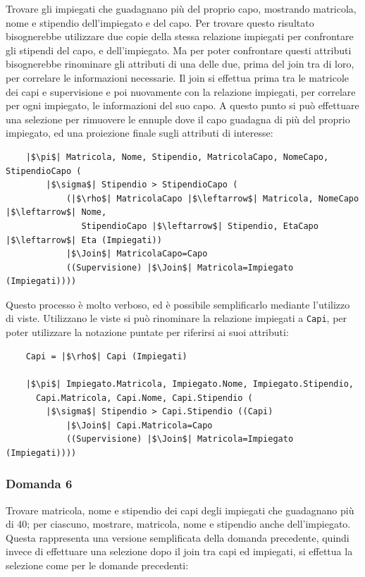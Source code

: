 \documentclass{article}
\begin{document}
Trovare gli impiegati che guadagnano più del proprio capo, mostrando matricola, nome e stipendio dell'impiegato e del capo. Per trovare questo risultato bisognerebbe utilizzare due copie della stessa relazione 
impiegati per confrontare gli stipendi del capo, e dell'impiegato. Ma per poter confrontare questi attributi bisognerebbe rinominare gli attributi di una delle due, prima del join tra di loro, per correlare 
le informazioni necessarie. Il join si effettua prima tra le matricole dei capi e supervisione e poi nuovamente con la relazione impiegati, per correlare per ogni impiegato, le informazioni del suo capo. A questo 
punto si può effettuare una selezione per rimuovere le ennuple dove il capo guadagna di più del proprio impiegato, ed una proiezione finale sugli attributi di interesse:

\begin{verbatim}
    |$\pi$| Matricola, Nome, Stipendio, MatricolaCapo, NomeCapo, StipendioCapo (
        |$\sigma$| Stipendio > StipendioCapo (
            (|$\rho$| MatricolaCapo |$\leftarrow$| Matricola, NomeCapo |$\leftarrow$| Nome, 
               StipendioCapo |$\leftarrow$| Stipendio, EtaCapo |$\leftarrow$| Eta (Impiegati))
            |$\Join$| MatricolaCapo=Capo
            ((Supervisione) |$\Join$| Matricola=Impiegato (Impiegati))))
\end{verbatim}


Questo processo è molto verboso, ed è possibile semplificarlo mediante l'utilizzo di viste. Utilizzano le viste si può rinominare la relazione impiegati a \verb|Capi|, per poter utilizzare la notazione puntate 
per riferirsi ai suoi attributi:
\begin{verbatim}
    Capi = |$\rho$| Capi (Impiegati) 

    |$\pi$| Impiegato.Matricola, Impiegato.Nome, Impiegato.Stipendio, 
      Capi.Matricola, Capi.Nome, Capi.Stipendio (
        |$\sigma$| Stipendio > Capi.Stipendio ((Capi)
            |$\Join$| Capi.Matricola=Capo
            ((Supervisione) |$\Join$| Matricola=Impiegato (Impiegati))))
\end{verbatim}

\subsubsection*{Domanda 6}

Trovare matricola, nome e stipendio dei capi degli impiegati che guadagnano più di 40; per ciascuno, mostrare, matricola, nome e stipendio anche dell'impiegato. Questa rappresenta una versione semplificata 
della domanda precedente, quindi invece di effettuare una selezione dopo il join tra capi ed impiegati, si effettua la selezione come per le domande precedenti:
\end{document}
